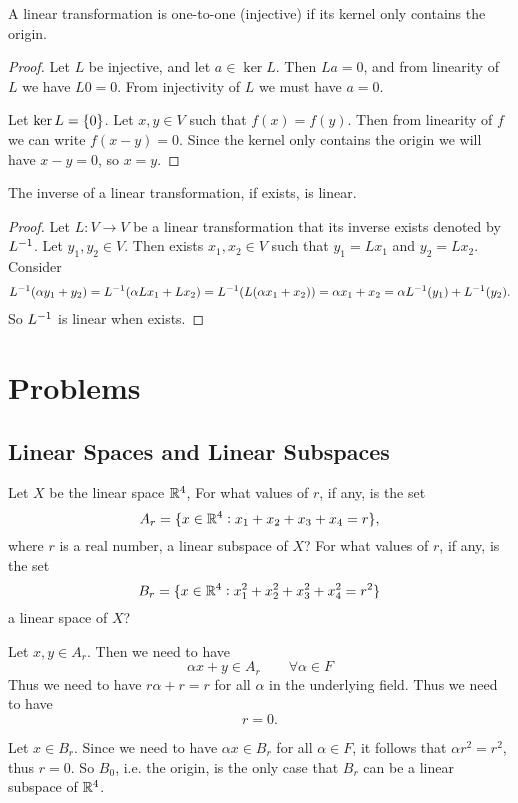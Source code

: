\begin{summary}
	A linear transformation is one-to-one (injective) if its kernel only contains the origin.
	\begin{proof}
		Let $ L $ be injective, and let $ a\in \ker L $. Then $ La = 0 $, and from linearity of $ L $ we have $ L0 = 0 $. From injectivity of $ L $ we must have $ a =0  $.
		
		Let $ \ker L = \{0\} $. Let $ x,y\in V $ such that $ f(x) = f(y) $. Then from linearity of $ f $ we can write $ f(x-y) = 0 $. Since the kernel only contains the origin we will have $ x-y= 0 $, so $ x= y $.
	\end{proof}
\end{summary}

\begin{summary}
	The inverse of a linear transformation, if exists, is linear. 
	\begin{proof}
		Let $ L:V\to V $ be a linear transformation that its inverse exists denoted by $ L^{-1} $. Let $ y_1,y_2 \in V $. Then exists $ x_1,x_2\in V $ such that $ y_1 = Lx_1 $ and $ y_2 = Lx_2 $. Consider
		\begin{align*}
			L^{-1}(\alpha y_1 + y_2) = L^{-1}(\alpha Lx_1+ Lx_2) = L^{-1}(L(\alpha x_1+x_2)) = \alpha x_1 + x_2  = \alpha L^{-1}(y_1) + L^{-1}(y_2).
		\end{align*}
		So $ L^{-1} $ is linear when exists.
	\end{proof}
\end{summary}



\section{Problems}

\subsection{Linear Spaces and Linear Subspaces}
\begin{problem}
	Let $ X $ be the linear space $ \mathbb{R}^4 $, For what values of $ r $, if any, is the set
	\[ A_r = \{x\in\mathbb{R}^4: x_1+x_2+x_3+x_4 = r\}, \]
	where $ r $ is a real number, a linear subspace of $ X $? For what values of $ r $, if any,
	is the set
	\[ B_r = \{x\in \mathbb{R}^4: x_1^2 + x_2^2 + x_3^2+x_4^2 = r^2\} \]
	a linear space of $ X $?
\end{problem}

\begin{solution}
	Let $ x,y \in A_r $. Then we need to have
	\[ \alpha x + y \in A_r \qquad \forall\alpha\in F \]
	Thus we need to have $ r\alpha + r = r $ for all $ \alpha $ in the underlying field. Thus we need to have
	\[ r = 0. \]
	
	Let $ x \in B_r $. Since we need to have $ \alpha x \in B_r $ for all $ \alpha\in F $, it follows that $ \alpha r^2 = r^2 $, thus $ r=0 $. So $ B_0 $, i.e. the origin, is the only case that $ B_r $ can be a linear subspace of $ \mathbb{R}^4 $.
\end{solution}


